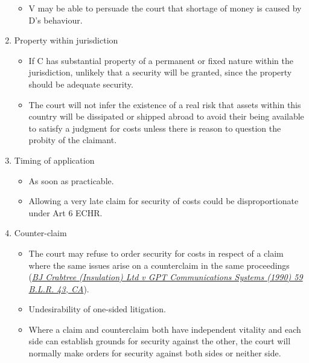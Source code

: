 \documentclass[
]{article}
\providecommand{\tightlist}{%
  \setlength{\itemsep}{0pt}\setlength{\parskip}{0pt}}
\begin{document}
\begin{enumerate}
  \begin{itemize}
  \tightlist
  \item
    V may be able to persuade the court that shortage of money is caused
    by D's behaviour.
  \end{itemize}
\item
  Property within jurisdiction

  \begin{itemize}
  \tightlist
  \item
    If C has substantial property of a permanent or fixed nature within
    the jurisdiction, unlikely that a security will be granted, since
    the property should be adequate security.
  \item
    The court will not infer the existence of a real risk that assets
    within this country will be dissipated or shipped abroad to avoid
    their being available to satisfy a judgment for costs unless there
    is reason to question the probity of the claimant.
  \end{itemize}
\item
  Timing of application

  \begin{itemize}
  \tightlist
  \item
    As soon as practicable.
  \item
    Allowing a very late claim for security of costs could be
    disproportionate under Art 6 ECHR.
  \end{itemize}
\item
  Counter-claim

  \begin{itemize}
  \tightlist
  \item
    The court may refuse to order security for costs in respect of a
    claim where the same issues arise on a counterclaim in the same
    proceedings
    (\href{https://uk.westlaw.com/Link/Document/FullText?findType=Y\&serNum=1993253243\&pubNum=4667\&originatingDoc=I32D50AF055AF11E797D3B1B628A5D84C\&refType=UC\&originationContext=document\&transitionType=CommentaryUKLink\&ppcid=8dad670bb95640e991013ba44df97305\&contextData=(sc.Category)}{\emph{BJ
    Crabtree (Insulation) Ltd v GPT Communications Systems (1990) 59
    B.L.R. 43, CA}}).
  \item
    Undesirability of one-sided litigation.
  \item
    Where a claim and counterclaim both have independent vitality and
    each side can establish grounds for security against the other, the
    court will normally make orders for security against both sides or
    neither side.
  \end{itemize}
\end{enumerate}
\end{document}
